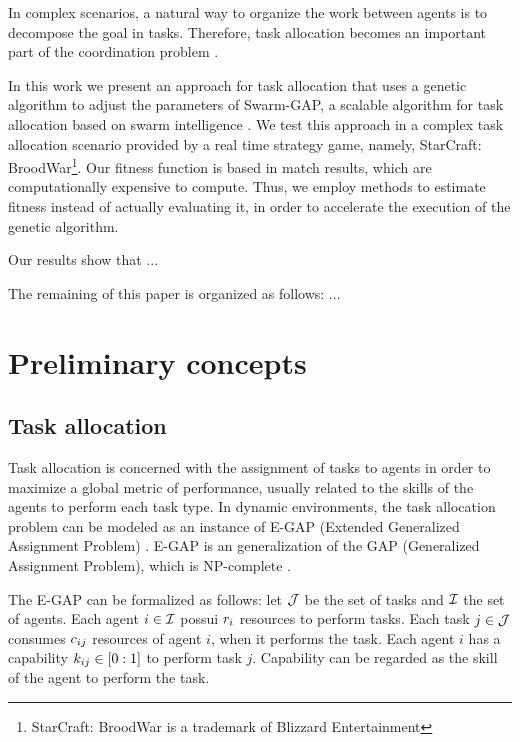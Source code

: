 \documentclass[conference]{IEEEtran}
\begin{document}
In complex scenarios, a natural way to organize the work between agents is to decompose the goal in tasks. Therefore, task allocation becomes an important part of the coordination problem \cite{Ferreira+2008ccmms}. 

In this work we present an approach for task allocation that uses a genetic algorithm to adjust the parameters of Swarm-GAP, a scalable algorithm for task allocation based on swarm intelligence \cite{Ferreira+2008ccmms}. We test this approach in a complex task allocation scenario provided by a real time strategy game, namely, StarCraft: BroodWar\footnote{StarCraft: BroodWar is a trademark of Blizzard Entertainment}. Our fitness function is based in match results, which are computationally expensive to compute. Thus, we employ methods to estimate fitness instead of actually evaluating it, in order to accelerate the execution of the genetic algorithm.

Our results show that ...

The remaining of this paper is organized as follows: ...

\section{Preliminary concepts}
\label{sec:concepts}


\subsection{Task allocation}
\label{sec:ta}

Task allocation is concerned with the assignment of tasks to agents in order to maximize a global metric of performance, usually related to the skills of the agents to perform each task type. In dynamic environments, the task allocation problem can be modeled as an instance of E-GAP (Extended Generalized Assignment Problem) \cite{Scerri+2005}. E-GAP is an generalization of the GAP (Generalized Assignment Problem), which is NP-complete \cite{Shmoys&Tardos1993}. 

The E-GAP can be formalized as follows: let $\mathcal{J}$ be the set of tasks and $\mathcal{I}$ the set of agents. Each agent $i \in \mathcal{I}$ possui $r_{i}$ resources to perform tasks. Each task $j \in \mathcal{J}$ consumes $c_{ij}$ resources of agent $i$, when it performs the task. Each agent $i$ has a capability $k_{ij} \in [0:1]$ to perform task $j$. Capability can be regarded as the skill of the agent to perform the task. %
\end{document}
